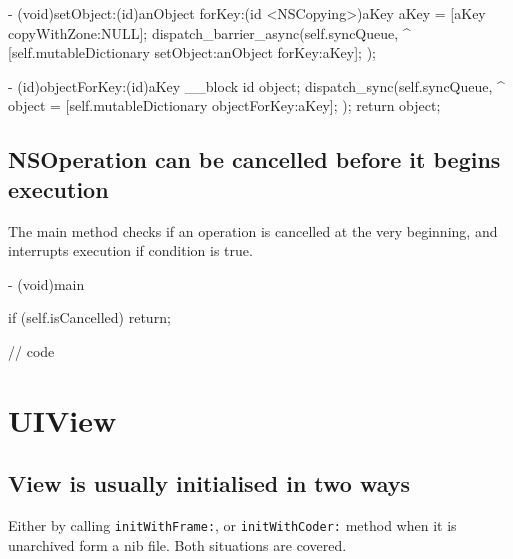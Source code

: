 \documentclass[10pt]{extarticle}
\newcommand{\inlinecode}[1]{{\textcolor{TundoraColor}{\texttt{#1}}}}
\begin{document}
\begin{codelisting}
- (void)setObject:(id)anObject forKey:(id <NSCopying>)aKey
{
    aKey = [aKey copyWithZone:NULL];
    dispatch_barrier_async(self.syncQueue, ^{
        [self.mutableDictionary setObject:anObject forKey:aKey];
    });
}

- (id)objectForKey:(id)aKey
{
    __block id object;
    dispatch_sync(self.syncQueue, ^{
        object = [self.mutableDictionary objectForKey:aKey];
    });
    return object;
}
\end{codelisting}


\subsection{NSOperation can be cancelled before it begins execution}

The main method checks if an operation is cancelled at the very beginning, and interrupts execution if condition is true.

\begin{codelisting}
- (void)main
{
    if (self.isCancelled) return;
    
    // code
}
\end{codelisting}


\section{UIView}

\subsection{View is usually initialised in two ways}

Either by calling \inlinecode{initWithFrame:}, or \inlinecode{initWithCoder:} method when it is unarchived form a nib file. Both situations are covered.
\end{document}
